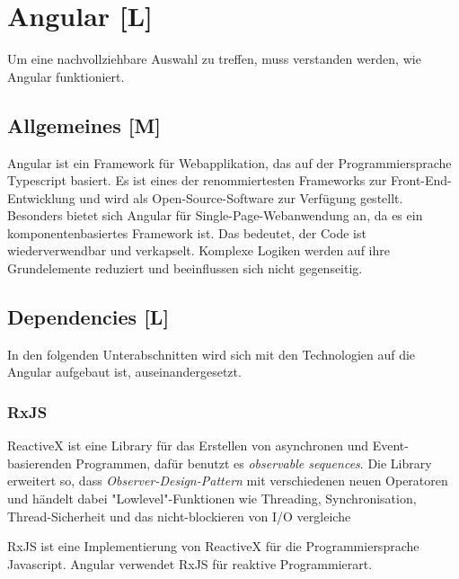 \section{Angular [L]}
Um eine nachvollziehbare Auswahl zu treffen, muss verstanden werden, wie Angular funktioniert. 

\subsection{Allgemeines [M]}
Angular ist ein Framework für Webapplikation, das auf der Programmiersprache Typescript basiert. Es ist eines der renommiertesten Frameworks zur Front-End-Entwicklung und wird als Open-Source-Software zur Verfügung gestellt. Besonders bietet sich Angular für Single-Page-Webanwendung an, da es ein komponentenbasiertes Framework ist. Das bedeutet, der Code ist wiederverwendbar und verkapselt. Komplexe Logiken werden auf ihre Grundelemente reduziert und beeinflussen sich nicht gegenseitig. 
\cite{AngularGeneral}

\subsection{Dependencies [L]}
In den folgenden Unterabschnitten wird sich mit den Technologien auf die Angular aufgebaut ist, auseinandergesetzt. 
\subsubsection{RxJS}
ReactiveX ist eine Library für das Erstellen von asynchronen und Event-basierenden Programmen, dafür benutzt es  \emph{observable sequences}.
Die Library erweitert so, dass \emph{Observer-Design-Pattern} mit verschiedenen neuen Operatoren und händelt dabei "Lowlevel"-Funktionen wie Threading, Synchronisation, Thread-Sicherheit und das nicht-blockieren von I/O vergleiche \cite{ReactiveXIntro}

RxJS ist eine Implementierung von ReactiveX für die Programmiersprache Javascript. Angular verwendet RxJS für reaktive Programmierart.
